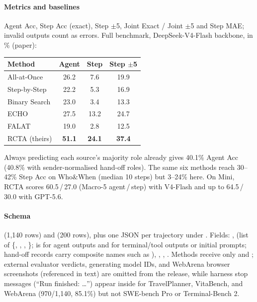 \paragraph{Metrics and baselines} Agent Acc, Step Acc (exact), Step $\pm$5, Joint Exact / Joint $\pm$5 and Step MAE; invalid outputs count as errors. Full benchmark, DeepSeek-V4-Flash backbone, in \% (paper):

\begin{center}\small
\begin{tabular}{@{}lccc@{}}\toprule
Method & Agent & Step & Step $\pm$5\\\midrule
All-at-Once & 26.2 & 7.6 & 19.9\\
Step-by-Step & 22.2 & 5.3 & 16.9\\
Binary Search & 23.0 & 3.4 & 13.3\\
ECHO & 27.5 & 13.2 & 24.7\\
FALAT & 19.0 & 2.8 & 12.5\\
RCTA (theirs) & \textbf{51.1} & \textbf{24.1} & \textbf{37.4}\\\bottomrule
\end{tabular}
\end{center}
Always predicting each source's majority role already gives 40.1\% Agent Acc (40.8\% with sender-normalised hand-off roles). The same six methods reach 30--42\% Step Acc on Who\&When (median 10 steps) but 3--24\% here. On Mini, RCTA scores 60.5\,/\,27.0 (Macro-5 agent\,/\,step) with V4-Flash and up to 64.5\,/\,30.0 with GPT-5.6.

\paragraph{Schema}  (1,140 rows) and  (200 rows), plus one JSON per trajectory under . Fields: ,  (list of \{, , , \};  is  for agent outputs and  for terminal/tool outputs or initial  prompts; hand-off records carry composite names such as ), , , . Methods receive only  and ; external evaluator verdicts, generating model IDs, and WebArena browser screenshots (referenced in text) are omitted from the release, while harness stop messages (``Run finished: \ldots'') appear inside  for TravelPlanner, VitaBench, and WebArena (970/1,140, 85.1\%) but not SWE-bench Pro or Terminal-Bench 2.


